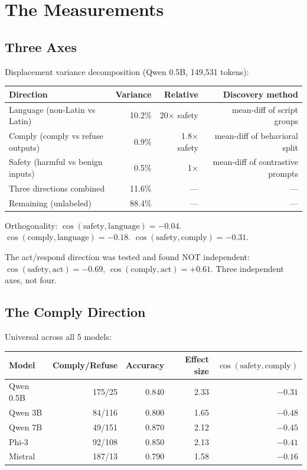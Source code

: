 \documentclass[11pt,a4paper]{report}
\begin{document}
\part{The Measurements}

\chapter{Three Axes}

Displacement variance decomposition (Qwen 0.5B, 149,531 tokens):

\begin{center}
\begin{tabular}{lrrr}
\toprule
\textbf{Direction} & \textbf{Variance} & \textbf{Relative} & \textbf{Discovery method} \\
\midrule
Language (non-Latin vs Latin) & 10.2\% & 20$\times$ safety & mean-diff of script groups \\
Comply (comply vs refuse outputs) & 0.9\% & 1.8$\times$ safety & mean-diff of behavioral split \\
Safety (harmful vs benign inputs) & 0.5\% & 1$\times$ & mean-diff of contrastive prompts \\
\midrule
Three directions combined & 11.6\% & --- & --- \\
Remaining (unlabeled) & 88.4\% & --- & --- \\
\bottomrule
\end{tabular}
\end{center}

Orthogonality: $\cos(\text{safety}, \text{language}) = -0.04$. $\cos(\text{comply}, \text{language}) = -0.18$. $\cos(\text{safety}, \text{comply}) = -0.31$.

The act/respond direction was tested and found NOT independent: $\cos(\text{safety}, \text{act}) = -0.69$, $\cos(\text{comply}, \text{act}) = +0.61$. Three independent axes, not four.

\chapter{The Comply Direction}

Universal across all 5 models:

\begin{center}
\begin{tabular}{lrrrr}
\toprule
\textbf{Model} & \textbf{Comply/Refuse} & \textbf{Accuracy} & \textbf{Effect size} & $\cos(\text{safety}, \text{comply})$ \\
\midrule
Qwen 0.5B & 175/25 & 0.840 & 2.33 & $-0.31$ \\
Qwen 3B & 84/116 & 0.800 & 1.65 & $-0.48$ \\
Qwen 7B & 49/151 & 0.870 & 2.12 & $-0.45$ \\
Phi-3 & 92/108 & 0.850 & 2.13 & $-0.41$ \\
Mistral & 187/13 & 0.790 & 1.58 & $-0.16$ \\
\bottomrule
\end{tabular}
\end{center}
\end{document}
